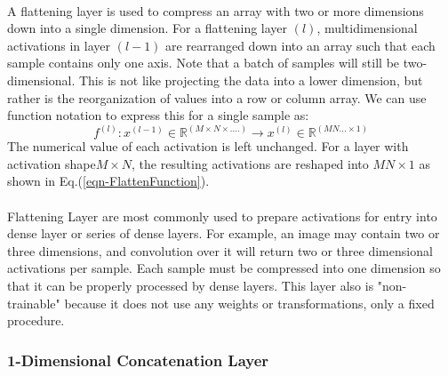 \documentclass[12pt,letterpaper]{article}
\begin{document}
\paragraph*{}A flattening layer is used to compress an array with two or more dimensions down into a single dimension. For a flattening layer $(l)$, multidimensional activations in layer $(l-1)$ are rearranged down into an array such that each sample contains only one axis. Note that a batch of samples will still be two-dimensional. This is not like projecting the data into a lower dimension, but rather is the reorganization of values into a row or column array. We can use function notation to express this for a single sample as:
\begin{equation}
\label{eqn-FlattenFunction}
f^{(l)} : x^{(l-1)} \in \mathbb{R}^{(M \times N \times ....)} \rightarrow
x^{(l)} \in \mathbb{R}^{(MN...\times 1)}
\end{equation}
The numerical value of each activation is left unchanged. For a layer with activation shape$M \times N$, the resulting activations are reshaped into $MN \times 1$ as shown in Eq.(\ref{eqn-FlattenFunction}).

\paragraph*{}Flattening Layer are most commonly used to prepare activations for entry into dense layer or series of dense layers. For example, an image may contain two or three dimensions, and convolution over it will return two or three dimensional activations per sample. Each sample must be compressed into one dimension so that it can be properly processed by dense layers. This layer also is "non-trainable" because it does not use any weights or transformations, only a fixed procedure.


\subsubsection{1-Dimensional Concatenation Layer}
\label{subsubsec-1DConcat}
\end{document}
